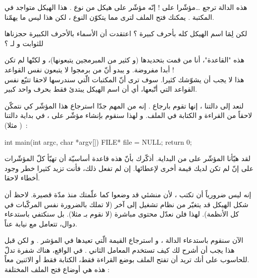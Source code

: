 هذه الدالة ترجع \dots مؤشّرا على
 !
إنّه مؤشّر على هيكل من نوع
.
هذا الهيكل متواجد في المكتبة
.
يمكنك فتح الملف لترى مما يتكوّن النوع
،
لكن هذا ليس ما يهمّنا.

\begin{question}
  لكن لِمَا اسم الهيكل كله بأحرف كبيرة ؟ اعتقدت أن الأسماء بالأحرف الكبيرة حجزناها للثوابت و لـ ؟
\end{question}

هذه "القاعدة"، أنا من قمت بتحديدها (و كثير من المبرمجين يتبعونها)، و لكنّها لم تكن أبدا مفروضة. و يبدو أنّ من برمجوا
لا يتبعون نفس القواعد !\\
هذا لا يجب أن يشوّشك كثيرا. سوف ترى أنّ المكتبات الّتي سندرسها لاحقا تتبّع نفس القواعد التي أتّبعها، أي أن اسم الهيكل يبتدئ فقط بحرف واحد كبير.

لنعد إلى دالتنا
،
إنها تقوم بارجاع
.
إنه من المهم جدّا استرجاع هذا المؤشّر كي نتمكّن لاحقاً من القراءة و الكتابة في الملف.  و لهذا سنقوم بإنشاء مؤشّر على
،
في بداية دالتنا
(
مثلا)~:

\begin{Csource}
int main(int argc, char *argv[])
{
	FILE* file = NULL;
	return 0;
}
\end{Csource}

لقد هيّأنا المؤشّر على
من البداية. أذكّرك بأنّ هذه قاعدة أساسيّة أن تهيّأ كلّ المؤشّرات على
إنّ لم تكن لديك قيمة أخرى لإعطائها. إن لم تفعل ذلك، فأنت تزيد كثيرا خطر وجود أخطاء لاحقا.

\begin{information}
  إنه ليس ضرورياً أن تكتب
،
لأن منشئي
قد وضعوا
كما علّمتك منذ مدّة قصيرة.
لاحظ أن شكل الهيكل قد يتغيّر من نظام تشغيل إلى آخر (لا تملك بالضرورة نفس المركّبات في كل الأنظمة). لهذا فلن نعدّل محتوى
مباشرة (لا نقوم بـ
مثلا). بل سنكتفي باستدعاء دوال، تتعامل مع
نيابة عناً.
\end{information}

الآن سنقوم باستدعاء الدالة
،
و استرجاع القيمة الّتي تعيدها في المؤشر
.
و لكن قبل هذا يجب أن أشرح لك كيف تستخدم المعامل الثاني
.
في الواقع، هناك شفرة تدلّ للحاسوب على أنك تريد أن تفتح الملف بوضع القراءة فقط، الكتابة فقط أو الاثنين معاً.\\
هذه هي أوضاع فتح الملف المختلفة :

